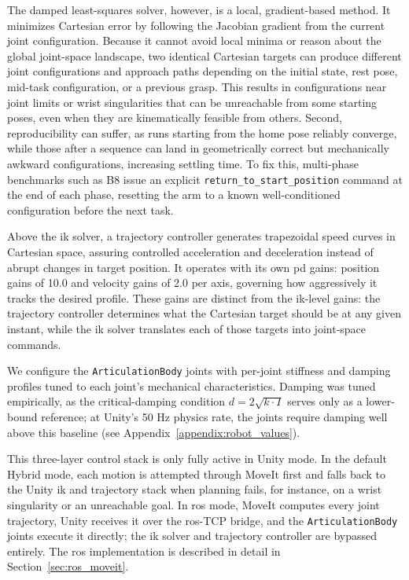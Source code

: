 \documentclass[
     12pt,
     a4paper,
     BCOR=10mm,
     DIV=14,
     listof=totoc,
     bibliography=totoc,
     parskip,
     twoside,
     headsepline
     ]{scrreprt}
\begin{document}
The damped least-squares solver, however, is a local, gradient-based method. It minimizes Cartesian error by following the Jacobian gradient from the current joint configuration. Because it cannot avoid local minima or reason about the global joint-space landscape, two identical Cartesian targets can produce different joint configurations and approach paths depending on the initial state, rest pose, mid-task configuration, or a previous grasp. This results in configurations near joint limits or wrist singularities that can be unreachable from some starting poses, even when they are kinematically feasible from others. Second, reproducibility can suffer, as runs starting from the home pose reliably converge, while those after a sequence can land in geometrically correct but mechanically awkward configurations, increasing settling time. To fix this, multi-phase benchmarks such as B8 issue an explicit \texttt{return\_to\_start\_position} command at the end of each phase, resetting the arm to a known well-conditioned configuration before the next task.

Above the \gls{ik} solver, a trajectory controller generates trapezoidal speed curves in Cartesian space, assuring controlled acceleration and deceleration instead of abrupt changes in target position. It operates with its own \gls{pd} gains: position gains of 10.0 and velocity gains of 2.0 per axis, governing how aggressively it tracks the desired profile. These gains are distinct from the \gls{ik}-level gains: the trajectory controller determines what the Cartesian target should be at any given instant, while the \gls{ik} solver translates each of those targets into joint-space commands.

We configure the \texttt{ArticulationBody} joints with per-joint stiffness and damping profiles tuned to each joint's mechanical characteristics. Damping was tuned empirically, as the critical-damping condition $d = 2\sqrt{k \cdot I}$ serves only as a lower-bound reference; at Unity's 50 Hz physics rate, the joints require damping well above this baseline (see Appendix~\ref{appendix:robot_values}).

This three-layer control stack is only fully active in Unity mode. In the default Hybrid mode, each motion is attempted through MoveIt first and falls back to the Unity \gls{ik} and trajectory stack when planning fails, for instance, on a wrist singularity or an unreachable goal. In \gls{ros} mode, MoveIt computes every joint trajectory, Unity receives it over the \gls{ros}-TCP bridge, and the \texttt{ArticulationBody} joints execute it directly; the \gls{ik} solver and trajectory controller are bypassed entirely. The \gls{ros} implementation is described in detail in Section~\ref{sec:ros_moveit}.
\end{document}
